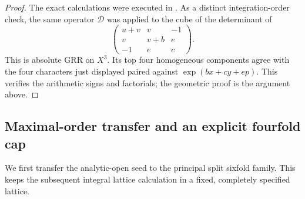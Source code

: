 \documentclass[11pt,a4paper]{article}
\theoremstyle{definition}\newtheorem{definition}[theorem]{Definition}
\theoremstyle{remark}\newtheorem{remark}[theorem]{Remark}
\begin{document}
\begin{proof}
The exact calculations were executed in
.
As a distinct integration-order check, the same operator
$\mathcal D$ was applied to the cube of the determinant of
\[
 \begin{pmatrix}
 u+v&v&-1\\
 v&v+b&e\\
 -1&e&c
 \end{pmatrix}.
\]
This is absolute GRR on $X^3$. Its top four homogeneous components
agree with the four characters just displayed paired against
$\exp(bx+cy+ep)$. This verifies the arithmetic signs and factorials;
the geometric proof is the argument above.
\end{proof}

\subsection{Maximal-order transfer and an explicit fourfold cap}

We first transfer the analytic-open seed to the principal split
sixfold family. This keeps the subsequent integral lattice calculation
in a fixed, completely specified lattice.
\end{document}
